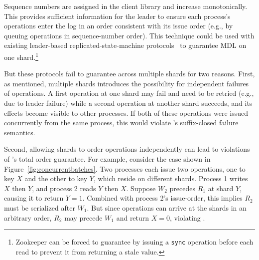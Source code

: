 
 Sequence numbers are assigned in the client 
library and increase monotonically. This provides sufficient information for
the leader to ensure each process's operations enter the log in an
order consistent with its issue order
(e.g., by queuing operations in sequence-number order).
This technique could be used with existing leader-based replicated-state-machine
protocols~\cite{ongaro2014raft,lamport1998paxos,oki1988vr} to guarantee
MDL on one shard.\footnote{Zookeeper can be forced to
guarantee \MDL{} by issuing a \texttt{sync} operation before each read to prevent it from returning a stale value.}

But these protocols fail to 
guarantee \MDL{} across multiple shards for two reasons. First,
as mentioned, multiple shards
introduces the possibility for independent failures of operations. A first
operation at one shard may fail and need to be retried (e.g., due to
leader failure) while a second operation at another shard succeeds, and
its effects become visible to other processes. If both of these
operations were issued concurrently from the same process, 
this would violate \MDL{}'s suffix-closed failure semantics.

Second, allowing shards to order operations independently can lead to
violations of \MDL{}'s total order guarantee. For example, consider the
case shown in Figure~\ref{fig:concurrentbatches}. Two processes each issue two
operations, one to key $X$ and the other to key $Y$, which reside on different
shards. Process 1 writes $X$ then $Y$, and process 2 reads $Y$ then $X$. Suppose $W_2$ precedes $R_1$ at shard $Y$, causing it to return $Y=1$. Combined with
process 2's issue-order, this implies $R_2$ must be serialized after $W_1$.
But since operations can arrive at the shards in an arbitrary order, $R_2$ may
precede $W_1$ and return $X=0$, violating \MDL{}.

%